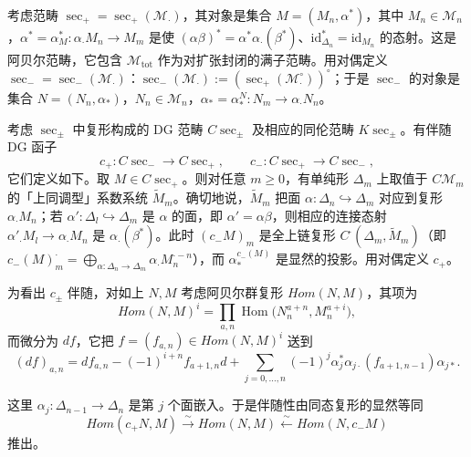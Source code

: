  考虑范畴 $\sec_{+}=\sec_{+}(\mathcal{M}_{\cdot})$，其对象是集合 $M=(M_{n},\alpha^{*})$，其中 $M_{n}\in\mathcal{M}_{n}$，$\alpha^{*}=\alpha^{*}_{M}:\alpha_{\cdot}M_{n}\to M_{m}$ 是使 $(\alpha\beta)^{*}=\alpha^{*}\alpha_{\cdot}(\beta^{*})$、$\mathrm{id}^{*}_{\Delta_{n}}=\mathrm{id}_{M_{n}}$ 的态射。这是阿贝尔范畴，它包含 $\mathcal{M}_{\mathrm{tot}}$ 作为对扩张封闭的满子范畴。用对偶定义 $\sec_{-}=\sec_{-}(\mathcal{M}_{\cdot})$：$\sec_{-}(\mathcal{M}_{\cdot}):=(\sec_{+}(\mathcal{M}^{\circ}_{\cdot}))^{\circ}$；于是 $\sec_{-}$ 的对象是集合 $N=(N_{n},\alpha_{*})$，$N_{n}\in\mathcal{M}_{n}$，$\alpha_{*}=\alpha^{N}_{*}:N_{m}\to\alpha_{\cdot}N_{n}$。

考虑 $\sec_{\pm}$ 中复形构成的 DG 范畴 $C\sec_{\pm}$ 及相应的同伦范畴 $K\sec_{\pm}$。有伴随 DG 函子
\begin{equation}\tag{313}
c_{+}:C\sec_{-}\longrightarrow C\sec_{+},\qquad c_{-}:C\sec_{+}\longrightarrow C\sec_{-},
\end{equation}
它们定义如下。取 $M\in C\sec_{+}$。则对任意 $m\ge0$，有单纯形 $\Delta_{m}$ 上取值于 $C\mathcal{M}_{m}$ 的「上同调型」系数系统 $\widetilde{M}_{m}$。确切地说，$\widetilde{M}_{m}$ 把面 $\alpha:\Delta_{n}\hookrightarrow\Delta_{m}$ 对应到复形 $\alpha_{\cdot}M_{n}$；若 $\alpha':\Delta_{l}\hookrightarrow\Delta_{m}$ 是 $\alpha$ 的面，即 $\alpha'=\alpha\beta$，则相应的连接态射 $\alpha'_{\cdot}M_{l}\to\alpha_{\cdot}M_{n}$ 是 $\alpha_{\cdot}(\beta^{*})$。此时 $(c_{-}M)_{m}$ 是全上链复形 $C^{\cdot}(\Delta_{m},\widetilde{M}_{m})$（即 $c_{-}(M)^{\cdot}_{m}=\bigoplus_{\alpha:\Delta_{n}\to\Delta_{m}}\alpha_{\cdot}M_{n}^{\cdot-n}$），而 $\alpha^{c_{-}(M)}_{*}$ 是显然的投影。用对偶定义 $c_{+}$。

为看出 $c_{\pm}$ 伴随，对如上 $N,M$ 考虑阿贝尔群复形 $Hom(N,M)$，其项为
\[
Hom(N,M)^{i}=\prod_{a,n}\operatorname{Hom}\bigl(N^{a+n}_{n},M^{a+i}_{n}\bigr),
\]
而微分为 $df$，它把 $f=(f_{a,n})\in Hom(N,M)^{i}$ 送到
\[
(df)_{a,n}=df_{a,n}-(-1)^{i+n}f_{a+1,n}d+\sum_{j=0,\ldots,n}(-1)^{j}\alpha^{*}_{j}\alpha_{j\cdot}(f_{a+1,n-1})\alpha_{j*}.
\]


这里 $\alpha_{j}:\Delta_{n-1}\to\Delta_{n}$ 是第 $j$ 个面嵌入。于是伴随性由同态复形的显然等同
\begin{equation}\tag{314}
Hom(c_{+}N,M)\xrightarrow{\sim}Hom(N,M)\xleftarrow{\sim}Hom(N,c_{-}M)
\end{equation}
推出。

